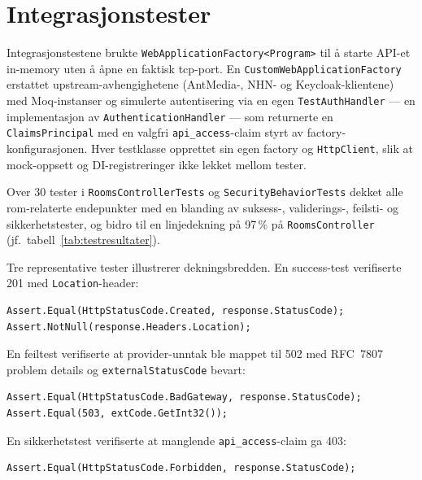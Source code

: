 \section{Integrasjonstester}
\label{sec:integrasjonstester}

Integrasjonstestene brukte \texttt{WebApplicationFactory<Program>} til å
starte API-et in-memory uten å åpne en faktisk \gls{tcp}-port. En
\texttt{CustomWebApplicationFactory} erstattet upstream-avhengighetene
(AntMedia-, NHN- og Keycloak-klientene) med Moq-instanser og simulerte
autentisering via en egen \texttt{TestAuthHandler} --- en implementasjon
av \texttt{AuthenticationHandler} --- som returnerte en
\texttt{ClaimsPrincipal} med en valgfri \texttt{api\_access}-claim styrt
av factory-konfigurasjonen. Hver testklasse opprettet sin egen factory og
\texttt{HttpClient}, slik at mock-oppsett og DI-registreringer ikke lekket
mellom tester.

Over 30 tester i \texttt{RoomsControllerTests} og
\texttt{SecurityBehaviorTests} dekket alle rom-relaterte endepunkter med
en blanding av suksess-, validerings-, feilsti- og sikkerhetstester, og
bidro til en linjedekning på 97\,\% på \texttt{RoomsController}
(jf.\ tabell~\ref{tab:testresultater}).

Tre representative tester illustrerer dekningsbredden. En success-test
verifiserte 201 med \texttt{Location}-header:

\begin{lstlisting}[language={[Sharp]C}, caption={201 med Location-header}]
Assert.Equal(HttpStatusCode.Created, response.StatusCode);
Assert.NotNull(response.Headers.Location);
\end{lstlisting}

En feiltest verifiserte at provider-unntak ble mappet til 502 med
RFC~7807 problem details og \texttt{externalStatusCode} bevart:

\begin{lstlisting}[language={[Sharp]C}, caption={502 med externalStatusCode}]
Assert.Equal(HttpStatusCode.BadGateway, response.StatusCode);
Assert.Equal(503, extCode.GetInt32());
\end{lstlisting}

En sikkerhetstest verifiserte at manglende \texttt{api\_access}-claim
ga 403:

\begin{lstlisting}[language={[Sharp]C}, caption={Manglende claim gir 403}]
Assert.Equal(HttpStatusCode.Forbidden, response.StatusCode);
\end{lstlisting}
